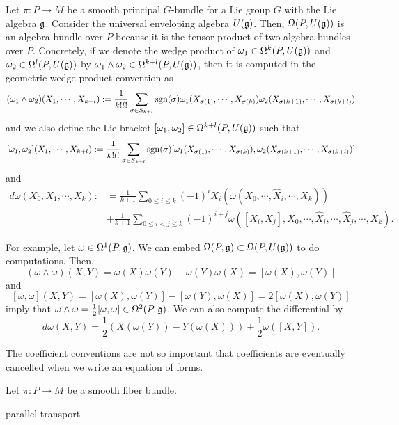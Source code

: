 \documentclass{../../large}
\begin{document}
\begin{prb}
Let $\pi:P\to M$ be a smooth principal $G$-bundle for a Lie group $G$ with the Lie algebra $\mathfrak{g}$.
Consider the universal enveloping algebra $U(\mathfrak{g})$.
Then, $\Omega(P,U(\mathfrak{g}))$ is an algebra bundle over $P$ because it is the tensor product of two algebra bundles over $P$.
Concretely, if we denote the wedge product of $\omega_1\in\Omega^k(P,U(\mathfrak{g}))$ and $\omega_2\in\Omega^l(P,U(\mathfrak{g}))$ by $\omega_1\wedge\omega_2\in\Omega^{k+l}(P,U(\mathfrak{g}))$, then it is computed in the geometric wedge product convention as
\[(\omega_1\wedge\omega_2)(X_1,\cdots,X_{k+l}):=\frac1{k!l!}\sum_{\sigma\in S_{k+l}}\operatorname{sgn}(\sigma)\omega_1(X_{\sigma(1)},\cdots,X_{\sigma(k)})\omega_2(X_{\sigma(k+1)},\cdots,X_{\sigma(k+l)})\]
and we also define the Lie bracket $[\omega_1,\omega_2]\in\Omega^{k+l}(P,U(\mathfrak{g}))$ such that
\[[\omega_1,\omega_2](X_1,\cdots,X_{k+l}):=\frac1{k!l!}\sum_{\sigma\in S_{k+l}}\operatorname{sgn}(\sigma)[\omega_1(X_{\sigma(1)},\cdots,X_{\sigma(k)}),\omega_2(X_{\sigma(k+1)},\cdots,X_{\sigma(k+l)})]\]
and
\begin{align*}
d\omega(X_0,X_1,\cdots,X_k):&=\frac1{k+1}\sum_{0\le i\le k}(-1)^iX_i(\omega(X_0,\cdots,\hat X_i,\cdots,X_k))\\
&+\frac1{k+1}\sum_{0\le i<j\le k}(-1)^{i+j}\omega([X_i,X_j],X_0,\cdots,\hat X_i,\cdots,\hat X_j,\cdots,X_k).
\end{align*}

For example, let $\omega\in\Omega^1(P,\mathfrak{g})$.
We can embed $\Omega(P,\mathfrak{g})\subset\Omega(P,U(\mathfrak{g}))$ to do computations.
Then,
\[(\omega\wedge\omega)(X,Y)=\omega(X)\omega(Y)-\omega(Y)\omega(X)=[\omega(X),\omega(Y)]\]
and
\[[\omega,\omega](X,Y)=[\omega(X),\omega(Y)]-[\omega(Y),\omega(X)]=2[\omega(X),\omega(Y)]\]
imply that $\omega\wedge\omega=\frac12[\omega,\omega]\in\Omega^2(P,\mathfrak{g})$.
We can also compute the differential by
\[d\omega(X,Y)=\frac12(X(\omega(Y))-Y(\omega(X)))+\frac12\omega([X,Y]).\]

The coefficient conventions are not so important that coefficients are eventually cancelled when we write an equation of forms.
\end{prb}


\begin{prb}
Let $\pi:P\to M$ be a smooth fiber bundle.

parallel transport
\end{prb}
\end{document}
